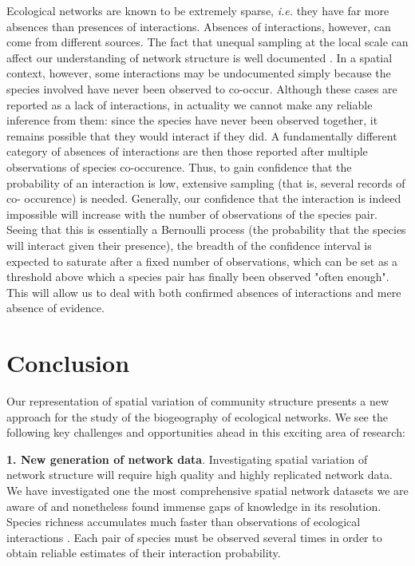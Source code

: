 \documentclass[12pt]{article}
\begin{document}
Ecological networks are known to be extremely sparse, \emph{i.e.} they have
far more absences than presences of interactions. Absences of interactions,
however, can come from different sources. The fact that unequal sampling at
the local scale can affect our understanding of network structure is well
documented \citep{Martinez1999}. In a spatial context, however, some
interactions may be undocumented simply because the species involved have
never been observed to co-occur. Although these cases are reported as a lack
of interactions, in actuality we cannot make any reliable inference from them:
since the species have never been observed together, it remains possible that
they would interact if they did. A fundamentally different category of
absences of interactions are then those reported after multiple observations
of species co-occurence. Thus, to gain confidence that the probability of an
interaction is low, extensive sampling (that is, several records of co-
occurence) is needed. Generally, our confidence that the interaction is indeed
impossible will increase with the number of observations of the species pair.
Seeing that this is essentially a Bernoulli process (the probability that the
species will interact given their presence), the breadth of the confidence
interval is expected to saturate after a fixed number of observations, which
can be set as a threshold above which a species pair has finally been observed
"often enough". This will allow us to deal with both confirmed absences of
interactions and mere absence of evidence.

\section*{Conclusion}

Our representation of spatial variation of community structure presents a new
approach for the study of the biogeography of ecological networks. We see the
following key challenges and opportunities ahead in this exciting area of
research:

\textbf{1. New generation of network data}. Investigating spatial
variation of network structure will require high quality and highly replicated
network data. We have investigated one the most comprehensive spatial network
datasets we are aware of and nonetheless found immense gaps of knowledge in its
resolution. Species richness accumulates much faster than observations of
ecological interactions \citep{Poisot2012}. Each pair of species must be
observed several times in order to obtain reliable estimates of their interaction
probability.
\end{document}
